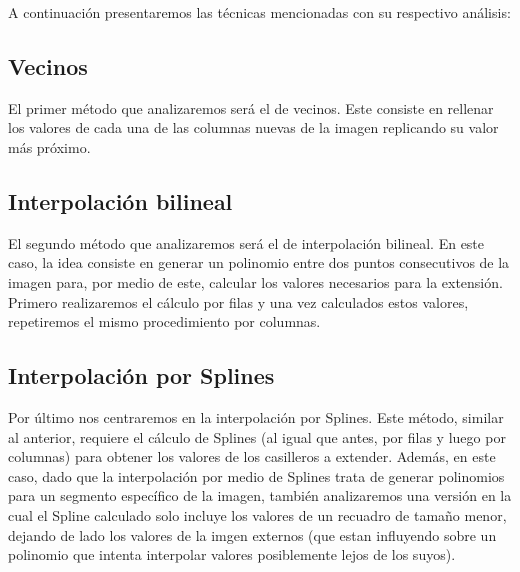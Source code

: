 A continuación presentaremos las técnicas mencionadas con su respectivo análisis:

\subsection{Vecinos}
El primer método que analizaremos será el de vecinos. Este consiste en rellenar los valores de cada una de las columnas
nuevas de la imagen replicando su valor más próximo.


\subsection{Interpolación bilineal}
El segundo método que analizaremos será el de interpolación bilineal. En este caso, la idea consiste en generar un polinomio entre
dos puntos consecutivos de la imagen para, por medio de este, calcular los valores necesarios para la extensión.
Primero realizaremos el cálculo por filas y una vez calculados estos valores, repetiremos el mismo procedimiento por columnas.


\subsection{Interpolación por Splines}
Por último nos centraremos en la interpolación por Splines. Este método, similar al anterior, requiere el cálculo de Splines
(al igual que antes, por filas y luego por columnas) para obtener los valores de los casilleros a extender.
Además, en este caso, dado que la interpolación por medio de Splines trata de generar polinomios para un segmento
específico de la imagen, también analizaremos una versión en la cual el Spline calculado solo incluye los valores de un recuadro de tamaño menor,
dejando de lado los valores de la imgen externos (que estan influyendo sobre un polinomio que intenta interpolar valores posiblemente lejos de los suyos).

